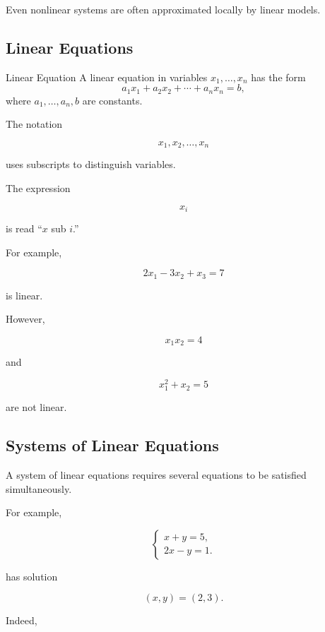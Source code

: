 Even nonlinear systems are often approximated locally by linear models.

\subsection{Linear Equations}
\label{subsec:linear-algebra-linear-equations}

\begin{definitionbox}{Linear Equation}
A linear equation in variables \(x_1,\ldots,x_n\) has the form
\[ a_1x_1+a_2x_2+\cdots+a_nx_n=b, \]
where \(a_1,\ldots,a_n,b\) are constants.
\end{definitionbox}

The notation

\[ x_1,x_2,\ldots,x_n \]

uses subscripts to distinguish variables.

The expression

\[ x_i \]

is read ``\(x\) sub \(i\).''

For example,

\[ 2x_1-3x_2+x_3=7 \]

is linear.

However,

\[ x_1x_2=4 \]

and

\[ x_1^2+x_2=5 \]

are not linear.

\subsection{Systems of Linear Equations}
\label{subsec:systems-linear-equations}

A system of linear equations requires several equations to be satisfied
simultaneously.

For example,

\[ \begin{cases} x+y=5,\\ 2x-y=1. \end{cases} \]

has solution

\[ (x,y)=(2,3). \]

Indeed,

